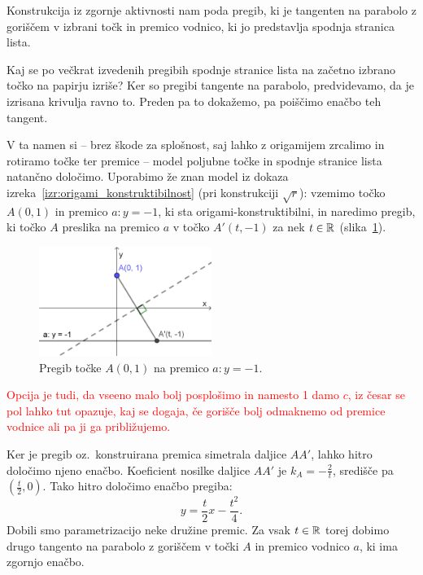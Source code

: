 \begin{trditev}
    Konstrukcija iz zgornje aktivnosti nam poda pregib, ki je tangenten na parabolo z goriščem v izbrani točk in premico vodnico, ki jo predstavlja spodnja stranica lista.
\end{trditev}

Kaj se po večkrat izvedenih pregibih spodnje stranice lista na začetno izbrano točko na papirju izriše? Ker so pregibi tangente na parabolo, predvidevamo, da je izrisana krivulja ravno to. Preden pa to dokažemo, pa poiščimo enačbo teh tangent.

V ta namen si -- brez škode za splošnost, saj lahko z origamijem zrcalimo in rotiramo točke ter premice -- model poljubne točke in  spodnje stranice lista natančno določimo. Uporabimo že znan model iz dokaza izreka~\ref{izr:origami_konstruktibilnost} (pri konstrukciji $\sqrt{r}$): vzemimo točko $A(0, 1)$ in premico $a: y = -1$, ki sta origami-konstruktibilni, in naredimo pregib, ki točko $A$ preslika na premico $a$ v točko $A'(t, -1)$ za nek $t \in \mathbb R$ (slika~\ref{fig:enacba_tangente_par1}).

\begin{figure}[h]
    \centering
    \includegraphics[width=0.5\textwidth]{images/enacba_parabole1.png}
    \caption[Enačba tangente na parabolo]{Pregib točke $A(0, 1)$ na premico $a: y = -1$.}
    \label{fig:enacba_tangente_par1}
\end{figure}

\textcolor{red}{Opcija je tudi, da vseeno malo bolj posplošimo in namesto 1 damo $c$, iz česar se pol lahko tut opazuje, kaj se dogaja, če gorišče bolj odmaknemo od premice vodnice ali pa ji ga približujemo.}

Ker je pregib oz.\ konstruirana premica simetrala daljice $AA'$, lahko hitro določimo njeno enačbo. Koeficient nosilke daljice $AA'$ je $k_A = -\frac{2}{t}$, središče pa $(\frac{t}{2}, 0)$. Tako hitro določimo enačbo pregiba:
\begin{equation}
    y = \frac{t}{2} x - \frac{t^2}{4}.
    \label{eq:tang_par}
\end{equation}
Dobili smo parametrizacijo neke družine premic. Za vsak $t \in \mathbb R$ torej dobimo drugo tangento na parabolo z goriščem v točki $A$ in premico vodnico $a$, ki ima zgornjo enačbo.


